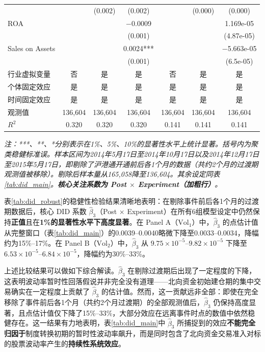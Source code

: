 \documentclass{article}
\begin{document}
\begin{table}[htbp]
{\begin{minipage}{1.2\textwidth}
\begin{tabular}{lcccccc}
            & & (0.002) & (0.002) & & (0.000) & (0.000) \\[0.3em]
            ROA & & & $-$0.0009 & & & 1.169e-05 \\
            & & & (0.001) & & & (4.87e-05) \\[0.3em]
            Sales on Assets & & & 0.0024*** & & & $-$5.663e-05 \\
            & & & (0.001) & & & (6.5e-05) \\[0.3em]
            \midrule
            行业虚拟变量 & 否 & 是 & 是 & 否 & 是 & 是 \\
            个体固定效应 & 是 & 是 & 是 & 是 & 是 & 是 \\
            时间固定效应 & 是 & 是 & 是 & 是 & 是 & 是 \\
            \midrule
            观测值 & 136,604 & 136,604 & 136,604 & 136,604 & 136,604 & 136,604 \\
            $R^2$ & 0.320 & 0.320 & 0.320 & 0.141 & 0.141 & 0.141 \\
            \bottomrule
        \end{tabular}
        \vspace{0.5em}
        \begin{minipage}{0.95\textwidth}
            \footnotesize\textit{注：***、**、*分别表示在1\%、5\%、10\%的显著性水平上统计显著。括号内为聚类稳健标准误。样本区间为2014年5月17日至2014年10月17日以及2014年12月17日至2015年5月17日，即剔除了沪港通开通前后各1个月的数据（共约2个月的过渡期观测值被移除）。剔除后样本量从165,058降至136,604。其余设定同表\ref{tab:did_main}。\textbf{核心关注系数为 Post $\times$ Experiment（加粗行）}。}
        \end{minipage}
    \end{minipage}%
    }
\end{table}

表\ref{tab:did_robust}的稳健性检验结果清晰地表明：在剔除事件前后各1个月的过渡期数据后，核心 DID 系数 $\hat{\beta}_3$（Post $\times$ Experiment）在所有6组模型设定中仍然保持\textbf{正值}且在\textbf{1\%的显著性水平下高度显著}。在 Panel A（$\text{Vol}_1$）中，$\hat{\beta}_3$ 的点估计值从完整窗口（表\ref{tab:did_main}）的0.0039--0.0040略微下降至0.0033--0.0034，降幅约为15\%--17\%。在 Panel B（$\text{Vol}_2$）中，$\hat{\beta}_3$ 从 $9.75 \times 10^{-5}$--$9.82 \times 10^{-5}$ 下降至 $6.53 \times 10^{-5}$--$6.84 \times 10^{-5}$，降幅约为30\%--33\%。

上述比较结果可以做如下综合解读。$\hat{\beta}_3$ 在剔除过渡期后出现了一定程度的下降，这表明波动率暂时性回落假说并非完全没有道理——北向资金初始建仓期的集中交易确实在一定程度上贡献了 $\hat{\beta}_3$ 的估计值。然而，这一贡献远非全部：即使在完全移除了事件前后各1个月（共约2个月过渡期）的全部观测值后，$\hat{\beta}_3$ 仍保持高度显著，且点估计值仅下降了15\%--33\%，大部分效应在远离事件时点的数值中依然稳健存在。这一结果有力地表明，表\ref{tab:did_main}中 $\hat{\beta}_3$ 所捕捉到的效应\textbf{不能完全归因于}制度转换初期的暂时性波动率飙升，而是同时包含了北向资金交易准入对标的股票波动率产生的\textbf{持续性系统效应}。
\end{document}
